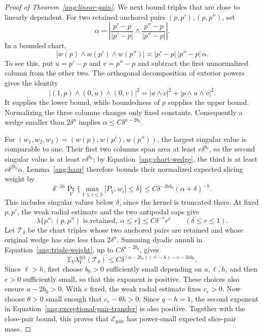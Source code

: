 \documentclass[11pt,reqno]{amsart}
\begin{document}
\begin{proof}[Proof of Theorem~\ref{ang:linear-gain}]
We next bound triples that are close to linearly dependent. For two
retained anchored pairs $(p,p'),(p,p'')$, set
\[
 \alpha=\left|
 \frac{p'-p}{|p'-p|}\wedge\frac{p''-p}{|p''-p|}\right|.
\]
In a bounded chart,
\begin{equation}\label{ang:chart-wedge}
 |w(p)\wedge w(p')\wedge w(p'')|
       \asymp |p'-p|\,|p''-p|\,\alpha.
\end{equation}
To see this, put $u=p'-p$ and $v=p''-p$ and subtract the first
unnormalized column from the other two. The orthogonal decomposition
of exterior powers gives the identity
\[
 |(1,p)\wedge(0,u)\wedge(0,v)|^2
       =|u\wedge v|^2+|p\wedge u\wedge v|^2.
\]
It supplies the lower bound, while boundedness of $p$ supplies the
upper bound. Normalizing the three columns changes only fixed constants.
Consequently a wedge smaller than $2\delta^a$ implies
$\alpha\le C\delta^{a-2b_0}$.

For $(w_1,w_2,w_3)=(w(p),w(p'),w(p''))$, the largest singular
value is comparable to one. Their first two columns span area at least $c\delta^{b_0}$,
so the second singular value is at least $c\delta^{b_0}$; by
Equation~\eqref{ang:chart-wedge}, the third is at least
$c\delta^{2b_0}\alpha$. Lemma~\ref{ang:haar} therefore bounds
their normalized expected slicing weight by
\begin{equation}\label{ang:triple-weight}
 \delta^{-3h}\Pr_V\{\max_{1\le i\le3}|P_{V^\perp}w_i|\le\delta\}
 \le C\delta^{-3hb_0}(\alpha+\delta)^{-h}.
\end{equation}
This includes singular values below $\delta$, since the kernel is
truncated there. At fixed $p,p'$, the weak radial estimate and
the two antipodal caps give
\[
 \lambda\{p'':(p,p'')\text{ is retained},\ \alpha\le r\}
       \le C\delta^{-e}r^\ell
       \qquad(\delta\le r\le1).
\]
Let $\mathcal T_\delta$ be the chart triples whose two anchored pairs
are retained and whose original wedge has size less than $2\delta^a$.
Summing dyadic annuli in Equation~\eqref{ang:triple-weight}, up to
$C\delta^{a-2b_0}$, gives
\begin{equation}\label{ang:bad-triples}
 \mathbb E_V\lambda_V^{\otimes3}(\mathcal T_\delta)
 \le C\delta^{(a-2b_0)(\ell-h)-e-3hb_0}.
\end{equation}
Since $\ell>h$, first choose $b_0>0$ sufficiently small depending
on $a,\ell,h$, and then $e>0$ sufficiently small, so that this
exponent is positive. These choices also ensure $a-2b_0>0$.
With $e$ fixed, the weak radial estimate fixes $c_e>0$. Now choose
$\theta>0$ small enough that $c_e-\theta h>0$. Since $q-h=1$, the
second exponent in Equation~\eqref{ang:exceptional-pair-transfer} is
also positive. Together with the close-pair bound, this proves that
$\mathcal E_{\mathrm{pair}}$ has power-small expected slice-pair mass.


\end{proof}
\end{document}
